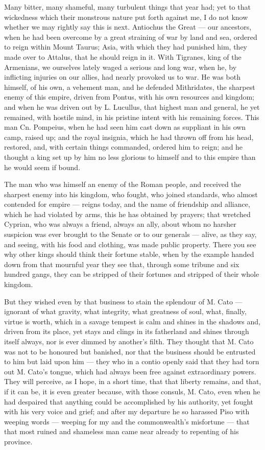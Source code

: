  Many bitter, many shameful, many turbulent things that year had; yet to that wickedness which their monstrous nature put forth against me, I do not know whether we may rightly say this is next. Antiochus the Great --- our ancestors, when he had been overcome by a great straining of war by land and sea, ordered to reign within Mount Taurus; Asia, with which they had punished him, they made over to Attalus, that he should reign in it. With Tigranes, king of the Armenians, we ourselves lately waged a serious and long war, when he, by inflicting injuries on our allies, had nearly provoked us to war. He was both himself, of his own, a vehement man, and he defended Mithridates, the sharpest enemy of this empire, driven from Pontus, with his own resources and kingdom; and when he was driven out by L. Lucullus, that highest man and general, he yet remained, with hostile mind, in his pristine intent with his remaining forces. This man Cn. Pompeius, when he had seen him cast down as suppliant in his own camp, raised up; and the royal insignia, which he had thrown off from his head, restored, and, with certain things commanded, ordered him to reign; and he thought a king set up by him no less glorious to himself and to this empire than he would seem if bound.

 The man who was himself an enemy of the Roman people, and received the sharpest enemy into his kingdom, who fought, who joined standards, who almost contended for empire --- reigns today, and the name of friendship and alliance, which he had violated by arms, this he has obtained by prayers; that wretched Cyprian, who was always a friend, always an ally, about whom no harsher suspicion was ever brought to the Senate or to our generals --- alive, as they say, and seeing, with his food and clothing, was made public property. There you see why other kings should think their fortune stable, when by the example handed down from that mournful year they see that, through some tribune and six hundred gangs, they can be stripped of their fortunes and stripped of their whole kingdom.

 But they wished even by that business to stain the splendour of M. Cato --- ignorant of what gravity, what integrity, what greatness of soul, what, finally, virtue is worth, which in a savage tempest is calm and shines in the shadows and, driven from its place, yet stays and clings in its fatherland and shines through itself always, nor is ever dimmed by another's filth. They thought that M. Cato was not to be honoured but banished, nor that the business should be entrusted to him but laid upon him --- they who in a contio openly said that they had torn out M. Cato's tongue, which had always been free against extraordinary powers. They will perceive, as I hope, in a short time, that that liberty remains, and that, if it can be, it is even greater because, with those consuls, M. Cato, even when he had despaired that anything could be accomplished by his authority, yet fought with his very voice and grief; and after my departure he so harassed Piso with weeping words --- weeping for my and the commonwealth's misfortune --- that that most ruined and shameless man came near already to repenting of his province.

